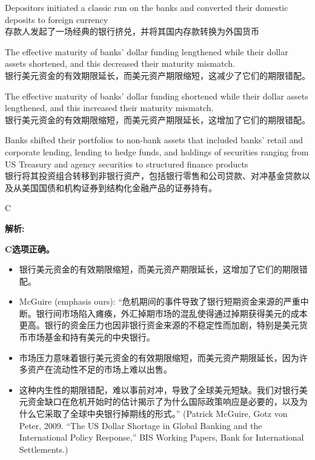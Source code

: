 \documentclass{article}
\newenvironment{explanation}
{\textbf{解析:}\par}
{\par}
\begin{document}
\begin{choices}
    \item Depositors initiated a classic run on the banks and converted their domestic deposits to foreign currency\\
    存款人发起了一场经典的银行挤兑，并将其国内存款转换为外国货币
    \item The effective maturity of banks’ dollar funding lengthened while their dollar assets shortened, and this decreased their maturity mismatch.\\
    银行美元资金的有效期限延长，而美元资产期限缩短，这减少了它们的期限错配。
    \item The effective maturity of banks’ dollar funding shortened while their dollar assets lengthened, and this increased their maturity mismatch.\\
    银行美元资金的有效期限缩短，而美元资产期限延长，这增加了它们的期限错配。
    \item Banks shifted their portfolios to non-bank assets that included banks’ retail and corporate lending, lending to hedge funds, and holdings of securities ranging from US Treasury and agency securities to structured finance products\\
    银行将其投资组合转移到非银行资产，包括银行零售和公司贷款、对冲基金贷款以及从美国国债和机构证券到结构化金融产品的证券持有。
\end{choices}

\begin{correctanswer}
C
\end{correctanswer}

\begin{explanation}
\textbf{C选项正确。} 
    \begin{itemize}
        \item 银行美元资金的有效期限缩短，而美元资产期限延长，这增加了它们的期限错配。
        \item McGuire (emphasis ours): “危机期间的事件导致了银行短期资金来源的严重中断。银行间市场陷入瘫痪，外汇掉期市场的混乱使得通过掉期获得美元的成本更高。银行的资金压力也因非银行资金来源的不稳定性而加剧，特别是美元货币市场基金和持有美元的中央银行。
        \item 市场压力意味着银行美元资金的有效期限缩短，而美元资产期限延长，因为许多资产在流动性不足的市场上难以出售。
        \item 这种内生性的期限错配，难以事前对冲，导致了全球美元短缺。我们对银行美元资金缺口在危机开始时的估计揭示了为什么国际政策响应是必要的，以及为什么它采取了全球中央银行掉期线的形式。” (Patrick McGuire, Gotz von Peter, 2009. “The US Dollar Shortage in Global Banking and the International Policy Response,” BIS Working Papers, Bank for International Settlements.)
    \end{itemize}
\end{explanation}
\end{document}
